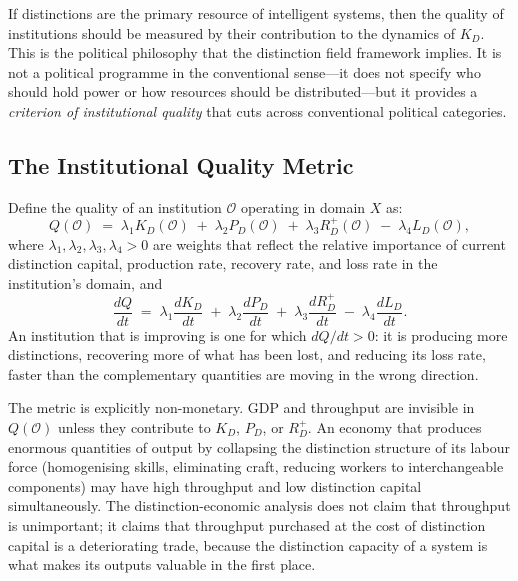 \documentclass[12pt, letterpaper]{article}
\theoremstyle{remark}
\begin{document}
If distinctions are the primary resource of intelligent systems, then the
quality of institutions should be measured by their contribution to the
dynamics of $K_D$.  This is the political philosophy that the distinction
field framework implies.  It is not a political programme in the conventional
sense---it does not specify who should hold power or how resources should
be distributed---but it provides a \emph{criterion of institutional quality}
that cuts across conventional political categories.

\subsection{The Institutional Quality Metric}

Define the quality of an institution $\mathcal{O}$ operating in domain
$X$ as:
\begin{equation}
  Q(\mathcal{O})
  \;=\;
  \lambda_1 K_D(\mathcal{O})
  \;+\;
  \lambda_2 P_D(\mathcal{O})
  \;+\;
  \lambda_3 R_D^{+}(\mathcal{O})
  \;-\;
  \lambda_4 L_D(\mathcal{O}),
\end{equation}
where $\lambda_1, \lambda_2, \lambda_3, \lambda_4 > 0$ are weights that
reflect the relative importance of current distinction capital, production
rate, recovery rate, and loss rate in the institution's domain, and
\begin{equation}
  \frac{dQ}{dt}
  \;=\;
  \lambda_1 \frac{dK_D}{dt}
  \;+\;
  \lambda_2 \frac{dP_D}{dt}
  \;+\;
  \lambda_3 \frac{dR_D^{+}}{dt}
  \;-\;
  \lambda_4 \frac{dL_D}{dt}.
\end{equation}
An institution that is improving is one for which $dQ/dt > 0$: it is
producing more distinctions, recovering more of what has been lost, and
reducing its loss rate, faster than the complementary quantities are moving
in the wrong direction.

The metric is explicitly non-monetary.  GDP and throughput are invisible
in $Q(\mathcal{O})$ unless they contribute to $K_D$, $P_D$, or $R_D^{+}$.
An economy that produces enormous quantities of output by collapsing the
distinction structure of its labour force (homogenising skills, eliminating
craft, reducing workers to interchangeable components) may have high throughput
and low distinction capital simultaneously.  The distinction-economic analysis
does not claim that throughput is unimportant; it claims that throughput
purchased at the cost of distinction capital is a deteriorating trade, because
the distinction capacity of a system is what makes its outputs valuable in
the first place.
\end{document}

